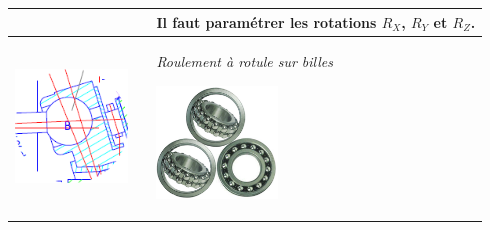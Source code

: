 \documentclass[10pt,oneside]{article}
\begin{document}
\begin{center}
\begin{tabular}{p{} c p{}}
\vspace{3cm}

$\quad$
& &
Il faut paramétrer les rotations $R_X$, $R_Y$ et $R_Z$. 


\\
\hline 
\begin{center}
\includegraphics[height=3cm]{png/ex_rotule} 
\end{center}
&&
\begin{center}
\textit{Roulement à rotule sur billes}

\includegraphics[height=3cm]{png/rltrotule.png} 
\end{center}\\
\hline 
\end{tabular}
\end{center}
\end{document}
